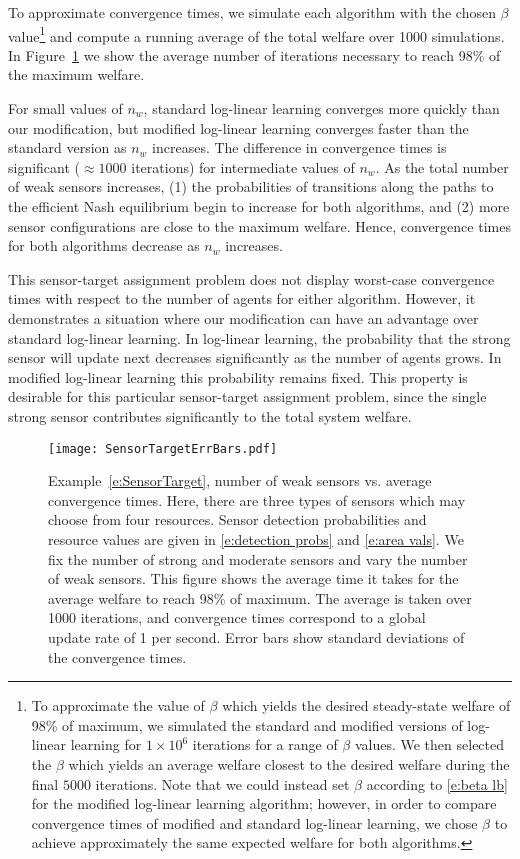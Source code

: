 \begin{example}
To approximate convergence times, we simulate each algorithm with the chosen $\beta$ value\footnote{To approximate the value of $\beta$ which yields the desired steady-state welfare of 98\% of maximum, we simulated the standard and modified versions of log-linear learning for $1\times 10^6$ iterations for a range of $\beta$ values. We then selected the $\beta$ which yields an average welfare closest to the desired welfare during the final $5000$ iterations. Note that we could instead set $\beta$ according to \eqref{e:beta lb} for the modified log-linear learning algorithm; however, in order to compare convergence times of modified and standard log-linear learning, we chose $\beta$ to achieve approximately the same expected welfare for both algorithms.} and compute a running average of the total welfare over 1000 simulations. In Figure~\ref{f:SensorTarget} we show the average number of iterations necessary to reach 98\% of the maximum welfare.
 
For small values of $n_w$, standard log-linear learning converges more quickly than our modification, but modified log-linear learning converges faster than the standard version as $n_w$ increases. The difference in convergence times is significant ($\approx 1000$ iterations) for intermediate values of $n_w.$ As the total number of weak sensors increases, (1) the probabilities of transitions along the paths to the efficient Nash equilibrium begin to increase for both algorithms, and (2) more sensor configurations are close to the maximum welfare. Hence, convergence times for both algorithms decrease as $n_w$ increases. 


This sensor-target assignment problem does not display worst-case convergence times with respect to the number of agents for either algorithm. However, it demonstrates a situation where our modification can have an advantage over standard log-linear learning. In log-linear learning, the probability that the strong sensor will update next decreases significantly as the number of agents grows. In modified log-linear learning this probability remains fixed. This property is desirable for this particular sensor-target assignment problem, since the single strong sensor contributes significantly to the total system welfare. 


\begin{figure}[ht]
  \centering
    \texttt{[image: SensorTargetErrBars.pdf]}
  \caption{ Example~\ref{e:SensorTarget}, number of weak sensors vs. average convergence times. Here, there are three types of sensors which may choose from four resources. Sensor detection probabilities and resource values are given in \eqref{e:detection probs} and \eqref{e:area vals}. We fix the number of strong and moderate sensors and vary the number of weak sensors. This figure shows the average time it takes for the average welfare to reach 98\% of maximum. The average is taken over 1000 iterations, and convergence times correspond to a global update rate of 1 per second. Error bars show standard deviations of the convergence times.\label{f:SensorTarget}}
\end{figure}


\end{example}
